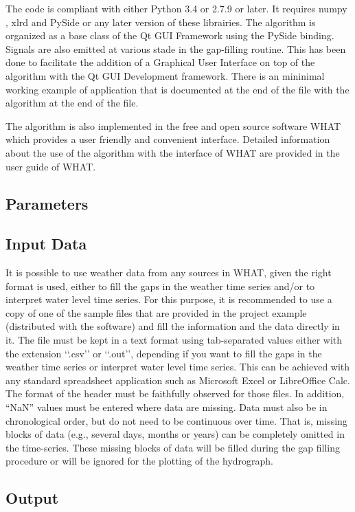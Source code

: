 \documentclass[TechnicalNoteMeteo.tex]{subfiles}
\begin{document}
The code is compliant with either Python 3.4 or 2.7.9 or later. It requires numpy , xlrd and PySide or any later version of these librairies. The algorithm is organized as a base class of the Qt GUI Framework using the PySide binding. Signals are also emitted at various stade in the gap-filling routine. This has been done to facilitate the addition of a Graphical User Interface on top of the algorithm with the Qt GUI Development framework. There is an mininimal working example of application that is documented at the end of the file with the algorithm at the end of the file.

The algorithm is also implemented in the free and open source software WHAT which provides a user friendly and convenient interface. Detailed information about the use of the algorithm with the interface of WHAT are provided in the user guide of WHAT.

\subsection{Parameters}\label{sec:parameters}

\subsection{Input Data}

It is possible to use weather data from any sources in WHAT, given the right format is used, either to fill the gaps in the weather time series and/or to interpret water level time series. For this purpose, it is recommended to use a copy of one of the sample files that are provided in the project example (distributed with the software) and fill the information and the data directly in it. The file must be kept in a text format using tab-separated values either with the extension ‘‘.csv’’ or ‘‘.out’’, depending if you want to fill the gaps in the weather time series or  interpret water level time series. This can be achieved with any standard spreadsheet application such as Microsoft Excel or LibreOffice Calc. The format of the header must be faithfully observed for those files. In addition, ``NaN'' values must be entered where data are missing. Data must also be in chronological order, but do not need to be continuous over time. That is, missing blocks of data (e.g., several days, months or years) can be completely omitted in the time-series. These missing blocks of data will be filled during the gap filling procedure or will be ignored for the plotting of the hydrograph.

\subsection{Output}\label{sec:output}
\end{document}
